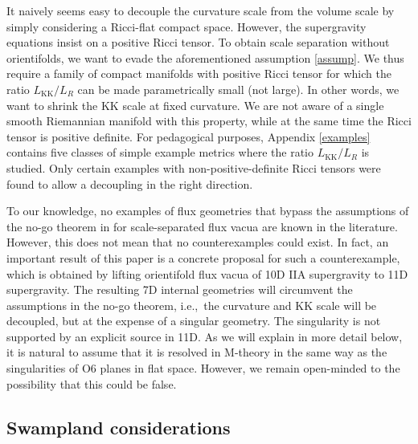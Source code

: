 \documentclass[11pt]{article}
\renewcommand{\[}{\left[}
\renewcommand{\]}{\right]}
\renewcommand{\(}{\left(}
\renewcommand{\)}{\right)}
\newcommand{\<}{\langle}
\renewcommand{\>}{\rangle}
\begin{document}
It naively seems easy to decouple the curvature scale from the volume scale by simply considering a Ricci-flat compact space. However, the supergravity equations insist on a positive Ricci tensor. To obtain scale separation without orientifolds, we want to evade the aforementioned assumption \eqref{assump}. We thus require a family of compact manifolds with positive Ricci tensor for which the ratio $L_\text{KK}/L_R$ can be made parametrically small (not large). In other words, we want to shrink the KK scale at fixed curvature. We are not aware of a single smooth Riemannian manifold with this property, while at the same time the Ricci tensor is positive definite. For pedagogical purposes, Appendix \ref{examples} contains five classes of simple example metrics where the ratio $L_\text{KK}/L_{R}$ is studied. Only certain examples with non-positive-definite Ricci tensors were found to allow a decoupling in the right direction.

To our knowledge, no examples of flux geometries that bypass the assumptions of the no-go theorem in \cite{Gautason:2015tig} for scale-separated flux vacua are known in the literature. However, this does not mean that no counterexamples could exist. In fact, an important result of this paper is a concrete proposal for such a counterexample, which is obtained by lifting orientifold flux vacua of 10D IIA supergravity to 11D supergravity. The resulting 7D internal geometries will circumvent the assumptions in the no-go theorem, i.e.,~the curvature and KK scale will be decoupled, but at the expense of a singular geometry. The singularity is not supported by an explicit source in 11D. As we will explain in more detail below, it is natural to assume that it is resolved in M-theory in the same way as the singularities of O6 planes in flat space. However, we remain open-minded to the possibility that this could be false. 


\subsection{Swampland considerations}
\end{document}
